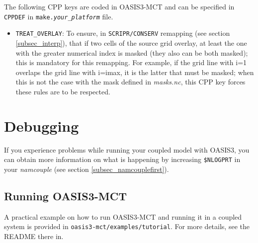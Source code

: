 The following CPP keys are coded in OASIS3-MCT and
can be specified in {\tt CPPDEF} in {\tt make.{\it your\_platform}} file.

\begin{itemize}

\item {\tt TREAT\_OVERLAY}: To ensure, in {\tt SCRIPR/CONSERV} remapping (see section
  \ref{subsec_interp}), that if two cells of the source grid overlay,
  at least the one with the greater numerical index is masked (they
  also can be both masked); this is mandatory for this remapping. For
  example, if the grid line with i=1 overlaps the grid line with
  i=imax, it is the latter that must be masked; when this is not the
  case with the mask defined in {\it masks.nc}, this CPP key forces
  these rules are to be respected.
\end{itemize}

\section{Debugging}

If you experience problems while running your coupled model with
OASIS3, you can obtain more information on what is happening by increasing {\tt \$NLOGPRT} in your {\it namcouple} (see section \ref{subsec_namcouplefirst}).

\subsection{Running OASIS3-MCT}

A practical example on how to run OASIS3-MCT and running it in a
coupled system is provided in {\tt oasis3-mct/examples/tutorial}. For
more details, see the README there in.

